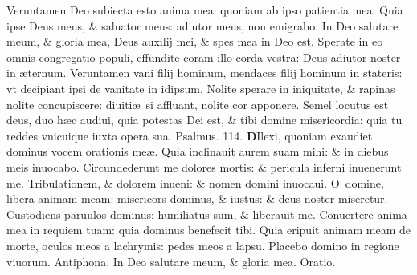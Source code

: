 \documentclass[a5paper,10pt]{book}
\def\ae{æ}
\begin{document}
\begin{multicols*}{2}
\newline \color{red} V\color{black}eruntamen Deo subiecta esto anima mea: quoniam ab ipso patientia mea.
\newline \color{red} Q\color{black}uia ipse Deus meus, \& saluator meus: adiutor meus, non emigrabo.
\newline \color{red} I\color{black}n Deo salutare meum, \& gloria mea, Deus auxilij mei, \& spes mea in Deo est.
\newline \color{red} S\color{black}perate in eo omnis congregatio populi, effundite coram illo corda vestra: Deus adiutor noster in \ae ternum.
\newline \color{red} V\color{black}eruntamen vani filij hominum, mendaces filij hominum in stateris: vt decipiant ipsi de vanitate in idipsum.
\newline \color{red} N\color{black}olite sperare in iniquitate, \& rapinas nolite concupiscere: diuiti\ae \ si affluant, nolite cor apponere.
\newline \color{red} S\color{black}emel locutus est deus, duo h\ae c audiui, quia potestas Dei est, \& tibi domine misericordia: quia tu reddes vnicuique iuxta opera sua. \quad \color{red} Psalmus. \hypertarget{ps114}{114.} \color{black}
\vspace{-.5em}
\lettrine[lines=2]{\bfseries \color{red} D}{}Ilexi, quoniam exaudiet dominus vocem orationis me\ae .
\newline \color{red} Q\color{black}uia inclinauit aurem suam mihi: \& in diebus meis inuocabo.
\newline \color{red} C\color{black}ircundederunt me dolores mortis: \& pericula inferni inuenerunt me.
\newline \color{red} T\color{black}ribulationem, \& dolorem inueni: \& nomen domini inuocaui.
\newline \color{red} O\color{black}\ domine, libera animam meam: misericors dominus, \& iustus: \& deus noster miseretur.
\newline \color{red} C\color{black}ustodiens paruulos dominus: humiliatus sum, \& liberauit me.
\newline \color{red} C\color{black}onuertere anima mea in requiem tuam: quia dominus benefecit tibi.
\newline \color{red} Q\color{black}uia eripuit animam meam de morte, oculos meos a lachrymis: pedes meos a lapsu.
\newline \color{red} P\color{black}lacebo domino in regione viuorum.
\newline \color{red} Antiphona. \color{black} In Deo salutare meum, \& gloria mea. \quad \color{red} Oratio. \color{black}

\end{multicols*}
\end{document}
